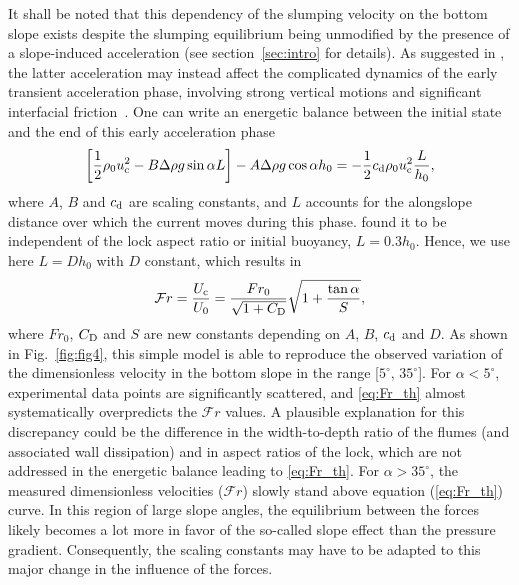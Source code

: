 \documentclass[12pt]{article}
\begin{document}
It shall be noted that this dependency of the slumping velocity on the bottom slope exists despite the slumping equilibrium being unmodified by the presence of a slope-induced acceleration (see section~\ref{sec:intro} for details). As suggested in \citet{Gadal2023}, the latter acceleration may instead affect the complicated dynamics of the early transient acceleration phase, involving strong vertical motions and significant interfacial friction~\citep{Cantero2007}.
%
One can write an energetic balance between the initial state and the end of this early acceleration phase \citep{Gadal2023}
\begin{equation}
	\label{eq:energetic_balance}
	\left[\frac{1}{2}\rho_{0}u_{\text c}^{2} - B \Delta\rho g \sin\alpha L\right] - A \Delta\rho g \cos\alpha h_{0} =  - \frac{1}{2}c_{\text d}\rho_{0}u_{\text c}^{2} \frac{L}{h_{0}},
\end{equation}
where $A$, $B$ and $c_{\text d}$ are scaling constants, and $L$ accounts for the alongslope distance over which the current moves during this phase. \citet{Cantero2007} found it to be independent of the lock aspect ratio or initial buoyancy, $L = 0.3 h_{0}$. Hence, we use here $L = D h_{0}$ with $D$ constant, which results in
\begin{equation}
	\label{eq:Fr_th}
	\mathcal{F}r = \frac{U_{\text c}}{U_0} = \frac{Fr_0}{\sqrt{1 + C_{\text D}}} \sqrt{1 + \frac{\tan\alpha}{S}},
\end{equation}
where $Fr_0$, $C_{\text D}$ and $S$ are new constants depending on $A$, $B$, $c_{\text d}$ and $D$. As shown in Fig.~\ref{fig:fig4}, this simple model is able to reproduce the observed variation of the dimensionless velocity in the bottom slope in the range [$5^\circ$, $35^\circ$].
%
For $\alpha < 5^\circ$, experimental data points are significantly scattered, and \eqref{eq:Fr_th} almost systematically overpredicts the $\mathcal{F}r$ values. A plausible explanation for this discrepancy could be the difference in the width-to-depth ratio of the flumes (and associated wall dissipation) and in aspect ratios of the lock, which are not addressed in the energetic balance leading to \eqref{eq:Fr_th}.
%
For $\alpha > 35^\circ$, the measured dimensionless velocities ($\mathcal{F}r$) slowly stand above equation (\ref{eq:Fr_th}) curve. In this region of large slope angles, the equilibrium between the forces likely becomes a lot more in favor of the so-called slope effect than the pressure gradient. Consequently, the scaling constants may have to be adapted to this major change in the influence of the forces.
\end{document}
